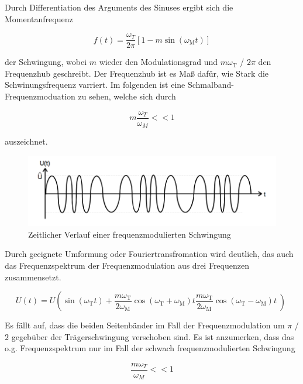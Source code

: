 Durch Differentiation des Arguments des Sinuses ergibt sich die Momentanfrequenz

\begin{equation}
f(t) = \frac{\omega_T}{2\pi}\left[1-m\sin(\omega_\text{M} t)\right]
\label{eq:momFreq}
\end{equation}

der Schwingung, wobei $m$ wieder den Modulationsgrad und $m\omega_\text{T}$ / $2\pi$ den Frequenzhub geschreibt. Der Frequenzhub ist es Maß dafür, wie Stark die Schwinungsfrequenz varriert. Im folgenden ist eine Schmalband-Frequenzmoduation zu sehen, welche sich durch

\begin{equation}
m\frac{\omega_T}{\omega_M} << 1
\end{equation}

auszeichnet.

\begin{figure}
	\centering
	\includegraphics[width=\textwidth]{img/Abb3.png}
	\caption{Zeitlicher Verlauf einer frequenzmodulierten Schwingung \cite{FP}}
\end{figure}

Durch geeignete Umformung oder Fouriertransfromation wird deutlich, das auch das Frequenzspektrum der Frequenzmodulation aus drei Frequenzen zusammensetzt.

\begin{equation}
U(t) = U \left( \sin( \omega_\text{T} t) + \frac{m\omega_\text{T}}{2\omega_\text{M}}\cos(\omega_\text{T} + \omega_\text{M}) t \frac{m \omega_\text{T}}{2\omega_\text{M}} \cos( \omega_\text{T} - \omega_\text{M} ) t\left)
\label{eq:FreqFreqMod}
\end{equation}

Es fällt auf, dass die beiden Seitenbänder im Fall der Frequenzmodulation um $\pi$ / $2$ gegebüber der Trägerschwingung verschoben sind. Es ist anzumerken, dass das o.g. Frequenzspektrum nur im Fall der schwach frequenzmodulierten Schwingung

\begin{equation}
\frac{m\omega_T}{\omega_M} << 1
\end{equation}

